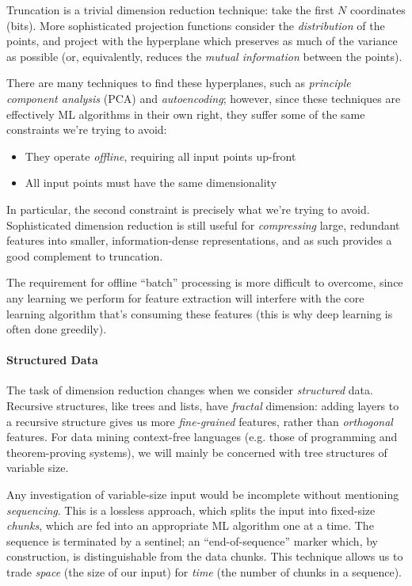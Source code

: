 Truncation is a trivial dimension reduction technique: take the first $N$
coordinates (bits). More sophisticated projection functions consider the
\emph{distribution} of the points, and project with the hyperplane which
preserves as much of the variance as possible (or, equivalently, reduces the
\emph{mutual information} between the points).

There are many techniques to find these hyperplanes, such as \emph{principle
  component analysis} (PCA) and \emph{autoencoding}; however, since these
techniques are effectively ML algorithms in their own right, they suffer some of
the same constraints we're trying to avoid:

\begin{itemize}
  \item They operate \emph{offline}, requiring all input points up-front
  \item All input points must have the same dimensionality
\end{itemize}

In particular, the second constraint is precisely what we're trying to
avoid. Sophisticated dimension reduction is still useful for \emph{compressing}
large, redundant features into smaller, information-dense representations, and
as such provides a good complement to truncation.

The requirement for offline ``batch'' processing is more difficult to overcome,
since any learning we perform for feature extraction will interfere with the
core learning algorithm that's consuming these features (this is why deep
learning is often done greedily).

\paragraph{Structured Data}

The task of dimension reduction changes when we consider \emph{structured}
data. Recursive structures, like trees and lists, have \emph{fractal} dimension:
adding layers to a recursive structure gives us more \emph{fine-grained}
features, rather than \emph{orthogonal} features. For data mining context-free
languages (e.g. those of programming and theorem-proving systems), we will
mainly be concerned with tree structures of variable size.

Any investigation of variable-size input would be incomplete without mentioning
\emph{sequencing}. This is a lossless approach, which splits the input into
fixed-size \emph{chunks}, which are fed into an appropriate ML algorithm one at
a time. The sequence is terminated by a sentinel; an ``end-of-sequence'' marker
which, by construction, is distinguishable from the data chunks. This technique
allows us to trade \emph{space} (the size of our input) for \emph{time} (the
number of chunks in a sequence).

